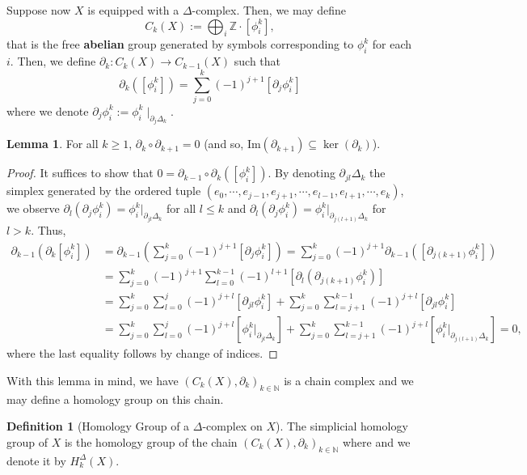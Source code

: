\documentclass[]{article}
\theoremstyle{definition}
\theoremstyle{definition}
\newtheorem{definition}{Definition}[section]
\newtheorem{lemma}{Lemma}[section]
\begin{document}
Suppose now \(X\) is equipped with a \(\Delta\)-complex. Then, we may define 
\[C_k(X) := \bigoplus_i \mathbb{Z} \cdot [\phi_i^k],\]
that is the free \textbf{abelian} group generated by symbols corresponding to 
\(\phi_i^k\) for each \(i\). Then, we define \(\partial_k : C_k(X) \to C_{k - 1}(X)\)
such that 
\[\partial_k([\phi_i^k]) = \sum_{j = 0}^k (-1)^{j + 1}[\partial_j \phi_i^k]\]
where we denote \(\partial_j \phi_i^k := \phi_i^k \mid_{\partial_j \Delta_k}\).

\begin{lemma}
  For all \(k \ge 1\), \(\partial_k \circ \partial_{k + 1} = 0\) (and so, 
  \(\text{Im}(\partial_{k + 1}) \subseteq \ker(\partial_k)\)).
\end{lemma}
\begin{proof}
  It suffices to show that \(0 = \partial_{k - 1} \circ \partial_k([\phi_i^k])\).
  By denoting \(\partial_{jl}\Delta_k\) the simplex generated by the ordered 
  tuple \((e_0, \cdots, e_{j - 1}, e_{j + 1}, \cdots, e_{l - 1}, e_{l + 1}, \cdots, e_k)\),
  we observe \(\partial_l (\partial_j \phi_i^k) = \phi_i^k |_{\partial_{jl} \Delta_k}\) for 
  all \(l \le k\) and \(\partial_l(\partial_j \phi_i^k) = \phi_i^k |_{\partial_{j(l+1)}\Delta_k}\) 
  for \(l > k\). Thus, 
  \[\begin{split}
    \partial_{k - 1}(\partial_k [\phi_i^k]) 
    & = \partial_{k - 1}\left(\sum_{j = 0}^k (-1)^{j + 1}[\partial_j \phi_i^k]\right)
      = \sum_{j = 0}^k (-1)^{j + 1}\partial_{k - 1}([\partial_{j(k+1)} \phi_i^k])\\
    & = \sum_{j = 0}^k (-1)^{j + 1}\sum_{l = 0}^{k - 1}(-1)^{l + 1}
      [\partial_l(\partial_{j(k+1)} \phi_i^k)]\\
    & = \sum_{j = 0}^k \sum_{l = 0}^{j}(-1)^{j + l}
      [\partial_{jl} \phi_i^k] 
      + \sum_{j = 0}^k \sum_{l = j + 1}^{k - 1}(-1)^{j + l}
      [\partial_{jl} \phi_i^k]\\
    & = \sum_{j = 0}^k \sum_{l = 0}^{j}(-1)^{j + l}
      [\phi_i^k |_{\partial_{jl} \Delta_k}] 
      + \sum_{j = 0}^k \sum_{l = j + 1}^{k - 1}(-1)^{j + l}
      [\phi_i^k |_{\partial_{j(l+1)}\Delta_k}] = 0,
  \end{split}\]
  where the last equality follows by change of indices. 
\end{proof}

With this lemma in mind, we have \((C_k(X), \partial_k)_{k \in \mathbb{N}}\) 
is a chain complex and we may define a homology group on this chain.

\begin{definition}[Homology Group of a \(\Delta\)-complex on \(X\)]
  The simplicial homology group of \(X\) is the homology group of the chain 
  \((C_k(X), \partial_k)_{k \in \mathbb{N}}\) where and we denote it by 
  \(H^\Delta_k(X)\).
\end{definition}
\end{document}
